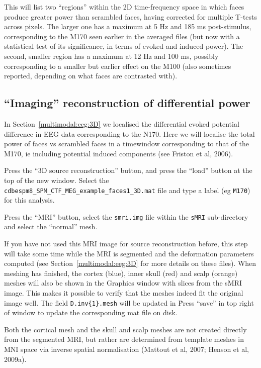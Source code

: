This will list two ``regions'' within the 2D time-frequency space in which faces produce greater power than scrambled faces, having corrected for multiple T-tests across pixels. The larger one has a maximum at 5 Hz and 185 ms post-stimulus, corresponding to the M170 seen earlier in the averaged files (but now with a statistical test of its significance, in terms of evoked and induced power). The second, smaller region has a maximum at 12 Hz and 100 ms, possibly corresponding to a smaller but earlier effect on the M100 (also sometimes reported, depending on what faces are contrasted with).

\subsection{``Imaging'' reconstruction of differential power}

In Section~\ref{multimodal:eeg:3D} we localised the differential evoked potential difference in EEG data corresponding to the N170.  Here we will localise the total power of faces vs scrambled faces in a timewindow corresponding to that of the M170, ie including potential induced components (see Friston et al, 2006).

Press the ``3D source reconstruction'' button, and press the ``load'' button at the top of the new window. Select the \texttt{cdbespm8\_SPM\_CTF\_MEG\_example\_faces1\_3D.mat} file and type a label (eg \texttt{M170}) for this analysis.

Press the ``MRI'' button, select the \texttt{smri.img} file within the \texttt{sMRI} sub-directory and select the ``normal'' mesh.

If you have not used this MRI image for source reconstruction before, this step will take some time while the MRI is segmented and the deformation parameters computed (see Section~\ref{multimodal:eeg:3D} for more details on these files). When meshing has finished, the cortex (blue), inner skull (red) and scalp (orange) meshes will also be shown in the Graphics window with slices from the sMRI image. This makes it possible to verify that the meshes indeed fit the original image well. The field \texttt{D.inv\{1\}.mesh} will be updated in \matlab\. Press ``save'' in top right of window to update the corresponding mat file on disk.

Both the cortical mesh and the skull and scalp meshes are not created directly from the segmented MRI, but rather are determined from template meshes in MNI space via inverse spatial normalisation (Mattout et al, 2007; Henson et al, 2009a).

